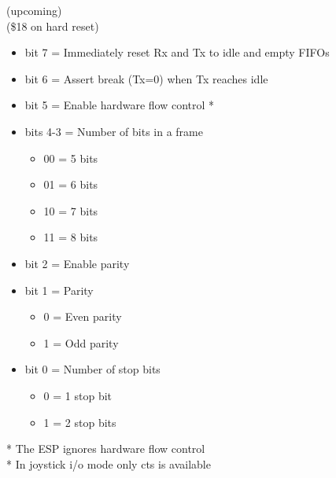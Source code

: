  (upcoming)\\
(\$18 on hard reset)
\begin{itemize}
\item[] bit 7 = Immediately reset Rx and Tx to idle and empty FIFOs
\item[] bit 6 = Assert break (Tx=0) when Tx reaches idle
\item[] bit 5 = Enable hardware flow control *
\item[] bits 4-3 = Number of bits in a frame
  \begin{itemize}
  \item[] 00 = 5 bits
  \item[] 01 = 6 bits
  \item[] 10 = 7 bits
  \item[] 11 = 8 bits
  \end{itemize}
\item[] bit 2 = Enable parity
\item[] bit 1 = Parity
  \begin{itemize}
  \item[] 0 = Even parity
  \item[] 1 = Odd parity
  \end{itemize}
\item[] bit 0 = Number of stop bits
  \begin{itemize}
  \item[] 0 = 1 stop bit
  \item[] 1 = 2 stop bits
  \end{itemize}
\end{itemize}
* The ESP ignores hardware flow control\\
* In joystick i/o mode only cts is available


